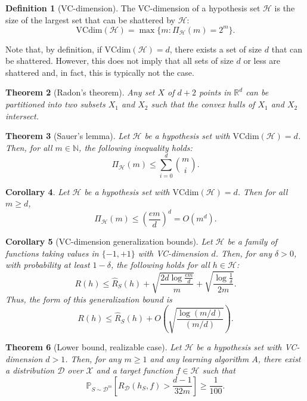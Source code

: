 \documentclass[12pt]{article}
\theoremstyle{definition} %
\newtheorem{definition}{Definition}[section]
\theoremstyle{plain} %
\newtheorem{theorem}[definition]{Theorem}
\newtheorem{corollary}[definition]{Corollary}
\theoremstyle{remark} %
\begin{document}
\begin{CJK}{UTF8}{gbsn}
\begin{definition}[VC-dimension]
The VC-dimension of a hypothesis set $\mathcal{H}$ is the size of the largest set that can be shattered by $\mathcal{H}$:
\[
\mathrm{VCdim}(\mathcal{H}) = \max \{ m : \Pi_{\mathcal{H}}(m) = 2^m \}. \tag{3.24}
\]
\end{definition}

Note that, by definition, if $\mathrm{VCdim}(\mathcal{H}) = d$, there exists a set of size $d$ that can be shattered. However, this does not imply that all sets of size $d$ or less are shattered and, in fact, this is typically not the case.

\begin{theorem}[Radon's theorem]
Any set $X$ of $d+2$ points in $\mathbb{R}^d$ can be partitioned 
into two subsets $X_1$ and $X_2$ such that the convex hulls of $X_1$ 
and $X_2$ intersect.
\end{theorem}

\begin{theorem}[Sauer's lemma]
Let $\mathcal{H}$ be a hypothesis set with $\mathrm{VCdim}(\mathcal{H}) = d$. 
Then, for all $m \in \mathbb{N}$, the following inequality holds:
\[
\Pi_{\mathcal{H}}(m) \leq \sum_{i=0}^{d} \binom{m}{i}.
\]
\end{theorem}

\begin{corollary}
Let $\mathcal{H}$ be a hypothesis set with $\mathrm{VCdim}(\mathcal{H}) = d$. 
Then for all $m \geq d$,
\[
\Pi_{\mathcal{H}}(m) \leq \left( \frac{em}{d} \right)^d = O(m^d).
\]
\end{corollary}

\begin{corollary}[VC-dimension generalization bounds]
Let $\mathcal{H}$ be a family of functions taking values in $\{-1,+1\}$ with VC-dimension $d$. 
Then, for any $\delta > 0$, with probability at least $1-\delta$, the following holds for all $h \in \mathcal{H}$:
\[
R(h) \leq \hat{R}_S(h) + \sqrt{\frac{2d \log \frac{em}{d}}{m}} + \sqrt{\frac{\log \frac{1}{\delta}}{2m}}.
\tag{3.29}
\]
Thus, the form of this generalization bound is
\[
R(h) \leq \hat{R}_S(h) + O\!\left(\sqrt{\frac{\log(m/d)}{(m/d)}}\right).
\tag{3.30}
\]
\end{corollary}


\begin{theorem}[Lower bound, realizable case]
Let $\mathcal{H}$ be a hypothesis set with VC-dimension $d > 1$. 
Then, for any $m \geq 1$ and any learning algorithm $A$, 
there exist a distribution $\mathcal{D}$ over $\mathcal{X}$ and a target function $f \in \mathcal{H}$ such that
\[
\mathbb{P}_{S \sim \mathcal{D}^m} \left[ R_{\mathcal{D}}(h_S, f) > \frac{d-1}{32m} \right] \geq \frac{1}{100}.
\tag{3.31}
\]
\end{theorem}


\end{CJK}
\end{document}
